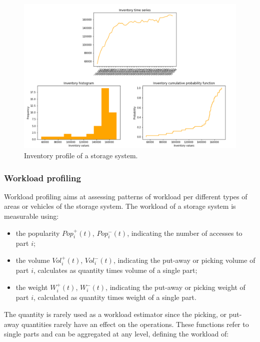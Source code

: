 \begin{figure}[hbt!]
\centering
\includegraphics[width=1.0\textwidth]{SectionWarehouses/control_figures/fig_inventory_profile.png}
\captionsetup{type=figure}
\caption{Inventory profile of a storage system.}
\label{fig_inventory_profile}
\end{figure}

\clearpage

\subsubsection{Workload profiling}
Workload profiling aims at assessing patterns of workload per different types of areas or vehicles of the storage system. The workload of a storage system is measurable using:

\begin{itemize}
    \item the popularity $Pop_i^+(t)$, $Pop_i^-(t)$, indicating the number of accesses to part $i$;
	\item the volume $Vol_i^+(t)$, $Vol_i^-(t)$, indicating the put-away or picking volume of part $i$, calculates as quantity times volume of a single part;
	\item the weight $W_i^+(t)$, $W_i^-(t)$, indicating the put-away or picking weight of part $i$, calculated as quantity times weight of a single part.

\end{itemize}

The quantity is rarely used as a workload estimator since the picking, or put-away quantities rarely have an effect on the operations. These functions refer to single parts and can be aggregated at any level, defining the workload of:


